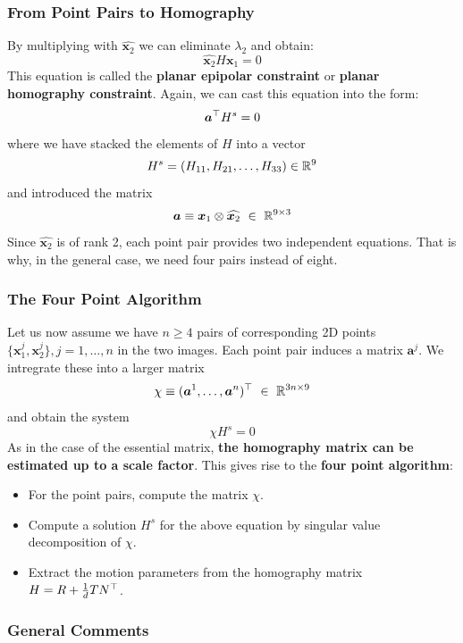 \subsubsection*{From Point Pairs to Homography}%
\label{ssub:from_point_pairs_to_homography}


By multiplying with $\widehat{\bm{x}_2}$ we can eliminate $\lambda_2$ and obtain:
\[
	\boxed{ \widehat{\bm{x}_2} H \bm{x}_1 = 0 }
\]
This equation is called the \textbf{planar epipolar constraint} or
\textbf{planar homography constraint}.
Again, we can cast this equation into the form:
\[
	\bm{a}^{\top} H^s = 0
\]
where we have stacked the elements of $H$ into a vector
\[
	H^s = (H_{11}, H_{21}, \ldots, H_{33}) \in \mathbb{R}^9
\]
and introduced the matrix
\[
	\bm{a} \equiv \bm{x}_1 \otimes \widehat{\bm{x}_2}\ \in \ \mathbb{R}^{9 \times{} 3}
\]
Since $\widehat{\bm{x}_2}$ is of rank 2, each point pair provides
two independent equations. That is why, in the general case,
we need four pairs instead of eight.


\subsubsection*{The Four Point Algorithm}%
\label{ssub:the_four_point_algorithm}

Let us now assume we have $n \geq 4$ pairs of corresponding 2D points
$\{ \bm{x}_1^j, \bm{x}_2^j \}, j= 1, \ldots, n$ in the two images.
Each point pair induces a matrix $\bm{a}^j$.
We intregrate these into a larger matrix
\[
	\chi \equiv \tr{( \bm{a}^1, \ldots, \bm{a}^n )}\ \in\ \RR{3n}{9}
\]
and obtain the system
\[
	\chi H^s = 0
\]
As in the case of the essential matrix,
\textbf{the homography matrix can be estimated up to a scale factor}.
This gives rise to the \textbf{four point algorithm}:
\begin{itemize}
	\item For the point pairs, compute the matrix $\chi$.
	\item Compute a solution $H^s$ for the above equation by singular
		value decomposition of $\chi$.
	\item Extract the motion parameters from the homography
		matrix $H = R + \frac{1}{d} T N^{\top}$.
\end{itemize}


\subsubsection*{General Comments}%
\label{ssub:general_comments}


